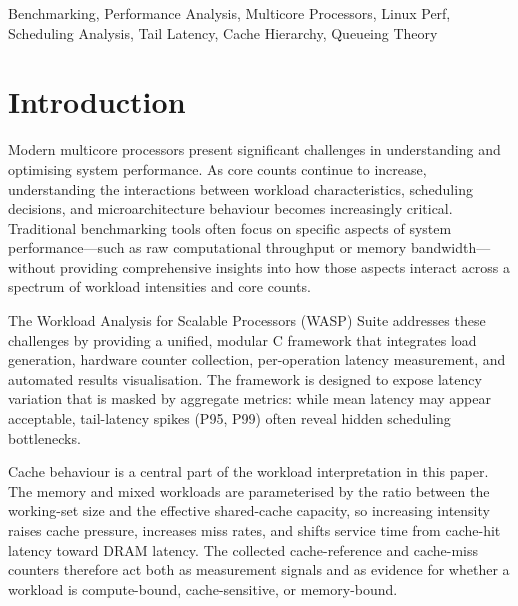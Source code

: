 \documentclass[conference]{IEEEtran}
\begin{document}
\begin{IEEEkeywords}
Benchmarking, Performance Analysis, Multicore Processors, Linux Perf,
Scheduling Analysis, Tail Latency, Cache Hierarchy, Queueing Theory
\end{IEEEkeywords}

\section{Introduction}
\label{sec:intro}

Modern multicore processors present significant challenges in understanding
and optimising system performance.  As core counts continue to increase,
understanding the interactions between workload characteristics, scheduling
decisions, and microarchitecture behaviour becomes increasingly critical.
Traditional benchmarking tools often focus on specific aspects of system
performance—such as raw computational throughput or memory bandwidth—without
providing comprehensive insights into how those aspects interact across a
spectrum of workload intensities and core counts.

The Workload Analysis for Scalable Processors (WASP) Suite addresses these challenges
by providing a unified, modular C framework that integrates load generation,
hardware counter collection, per-operation latency measurement, and automated
results visualisation.  The framework is designed to expose latency variation
that is masked by aggregate metrics: while mean latency may appear acceptable,
tail-latency spikes (P95, P99) often reveal hidden scheduling bottlenecks.

Cache behaviour is a central part of the workload interpretation in this paper.
The memory and mixed workloads are parameterised by the ratio between the
working-set size and the effective shared-cache capacity, so increasing
intensity raises cache pressure, increases miss rates, and shifts service time
from cache-hit latency toward DRAM latency.  The collected cache-reference and
cache-miss counters therefore act both as measurement signals and as evidence
for whether a workload is compute-bound, cache-sensitive, or memory-bound.
\end{document}
